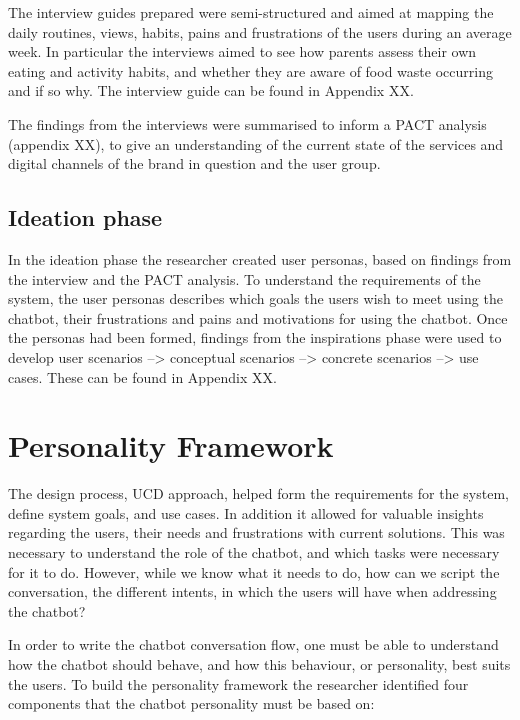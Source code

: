     The interview guides prepared were semi-structured and aimed at mapping the daily routines, views, habits, pains and frustrations of the users during an average week. In particular the interviews aimed to see how parents assess their own eating and activity habits, and whether they are aware of food waste occurring and if so why. The interview guide can be found in Appendix XX.
    
    The findings from the interviews were summarised to inform a PACT analysis (appendix XX), to give an understanding of the current state of the services and digital channels of the brand in question and the user group.

\vspace{2,5mm} %

    \subsection{Ideation phase}
    
    In the ideation phase the researcher created user personas, based on findings from the interview and the PACT analysis. To understand the requirements of the system, the user personas describes which goals the users wish to meet using the chatbot, their frustrations and pains and motivations for using the chatbot. Once the personas had been formed, findings from the inspirations phase were used to develop user scenarios --> conceptual scenarios --> concrete scenarios --> use cases. These can be found in Appendix XX.
    

    
\vspace{5mm} %

\section{Personality Framework}

The design process, UCD approach, helped form the requirements for the system, define system goals, and use cases. In addition it allowed for valuable insights regarding the users, their needs and frustrations with current solutions. This was necessary to understand the role of the chatbot, and which tasks were necessary for it to do. However, while we know what it needs to do, how can we script the conversation, the different intents, in which the users will have when addressing the chatbot? 

In order to write the chatbot conversation flow, one must be able to understand how the chatbot should behave, and how this behaviour, or personality, best suits the users. To build the personality framework the researcher identified four components that the chatbot personality must be based on:

